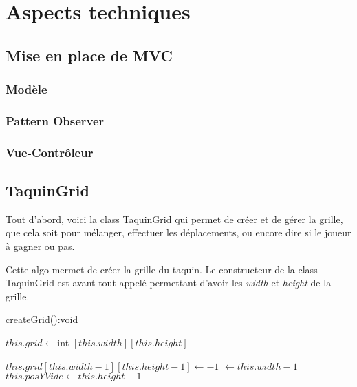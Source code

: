 \chapter{Aspects techniques}

	\section{Mise en place de MVC}

		\subsection{Modèle}



		\subsection{Pattern Observer}



		\subsection{Vue-Contrôleur}



	\section{TaquinGrid}

		Tout d'abord, voici la class TaquinGrid qui permet de créer et de gérer la grille, que cela soit pour mélanger, effectuer les déplacements, ou encore dire si le joueur à gagner ou pas.

		Cette algo mermet de créer la grille du taquin. Le constructeur de la class TaquinGrid est avant tout appelé permettant d'avoir les \textit{width} et \textit{height} de la grille.

		\begin{algorithm}
			\caption{createGrid():void}
			$this.grid \leftarrow $int $[this.width][this.height]$


			$this.grid[this.width-1][this.height-1] \leftarrow -1$
			$\leftarrow this.width-1$
			$this.posYVide \leftarrow this.height-1$
		\end{algorithm}

